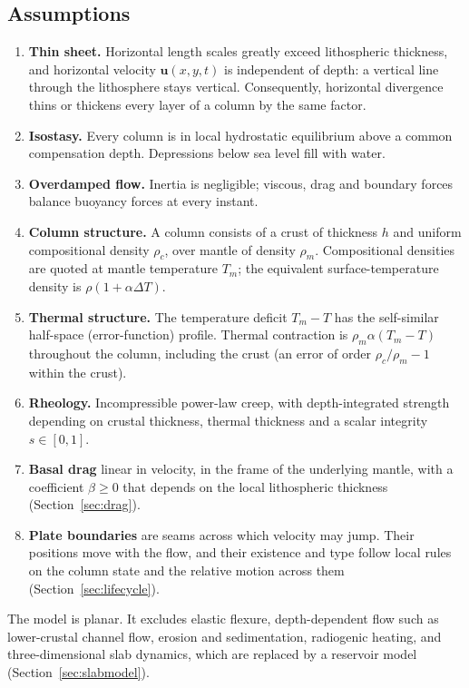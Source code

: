 \documentclass[11pt]{article}
\newcommand{\vect}[1]{\mathbf{#1}}
\begin{document}
\subsection{Assumptions}
\begin{enumerate}
\item \textbf{Thin sheet.} Horizontal length scales greatly exceed lithospheric thickness, and horizontal velocity $\vect{u}(x,y,t)$ is independent of depth: a vertical line through the lithosphere stays vertical. Consequently, horizontal divergence thins or thickens every layer of a column by the same factor.
\item \textbf{Isostasy.} Every column is in local hydrostatic equilibrium above a common compensation depth. Depressions below sea level fill with water.
\item \textbf{Overdamped flow.} Inertia is negligible; viscous, drag and boundary forces balance buoyancy forces at every instant.
\item \textbf{Column structure.} A column consists of a crust of thickness $h$ and uniform compositional density $\rho_c$, over mantle of density $\rho_m$. Compositional densities are quoted at mantle temperature $T_m$; the equivalent surface-temperature density is $\rho(1+\alpha\Delta T)$.
\item \textbf{Thermal structure.} The temperature deficit $T_m-T$ has the self-similar half-space (error-function) profile. Thermal contraction is $\rho_m\alpha(T_m-T)$ throughout the column, including the crust (an error of order $\rho_c/\rho_m-1$ within the crust).
\item \textbf{Rheology.} Incompressible power-law creep, with depth-integrated strength depending on crustal thickness, thermal thickness and a scalar integrity $s\in[0,1]$.
\item \textbf{Basal drag} linear in velocity, in the frame of the underlying mantle, with a coefficient $\beta\ge0$ that depends on the local lithospheric thickness (Section~\ref{sec:drag}).
\item \textbf{Plate boundaries} are seams across which velocity may jump. Their positions move with the flow, and their existence and type follow local rules on the column state and the relative motion across them (Section~\ref{sec:lifecycle}).
\end{enumerate}
The model is planar. It excludes elastic flexure, depth-dependent flow such as lower-crustal channel flow, erosion and sedimentation, radiogenic heating, and three-dimensional slab dynamics, which are replaced by a reservoir model (Section~\ref{sec:slabmodel}).
\end{document}
